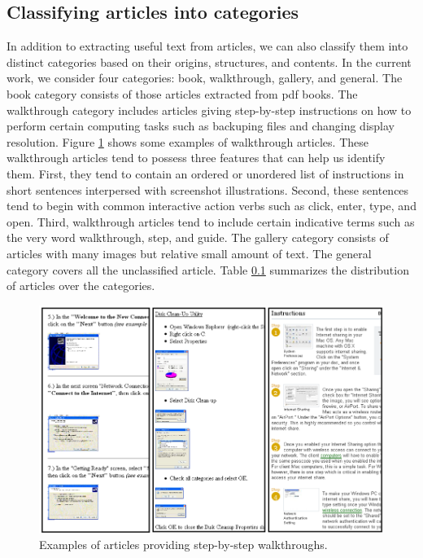 \documentclass{www2010-submission}
\begin{document}
\subsection{Classifying articles into categories}

In addition to extracting useful text from articles, we can also
classify them into distinct categories based on their origins,
structures, and contents.  In the current work, we consider four
categories: book, walkthrough, gallery, and general. The book category
consists of those articles extracted from pdf books. The walkthrough
category includes articles giving step-by-step instructions on how to
perform certain computing tasks such as backuping files and changing
display resolution. Figure \ref{fig:example_walkthrough} shows some
examples of walkthrough articles. These walkthrough articles tend to
possess three features that can help us identify them. First, they
tend to contain an ordered or unordered list of instructions in short
sentences interpersed with screenshot illustrations.  Second, these
sentences tend to begin with common interactive action verbs such as
click, enter, type, and open. Third, walkthrough articles tend to
include certain indicative terms such as the very word walkthrough,
step, and guide. The gallery category consists of articles with many
images but relative small amount of text. The general category covers
all the unclassified article. Table \ref{} summarizes the 
distribution of articles over the categories. 

\begin{figure}
\includegraphics[width=1\columnwidth]{figure/walkthrough_examples.png}
\caption{Examples of articles providing step-by-step walkthroughs.}
\label{fig:example_walkthrough}
\end{figure}
\end{document}
